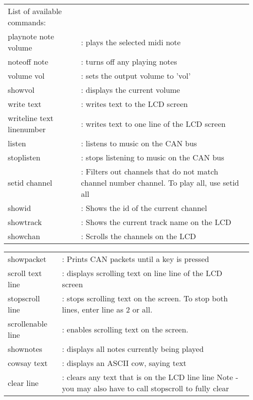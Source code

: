 \begin{table}[h]
\begin{tabular}{lp{8cm}}
List of available commands:\par\bigskip\noindent & \\
playnote note volume   & : plays the selected midi note\\
noteoff note           & : turns off any playing notes\\
volume vol           & : sets the output volume to 'vol'\\
showvol                & : displays the current volume\\
write text           & : writes text to the LCD screen\\
writeline text linenumber & : writes text to one line of the 
LCD screen\\ 
listen                 & : listens to music on the CAN bus\\
stoplisten             & : stops listening to music on the CAN bus\\
setid channel        & : Filters out channels that do not match 
channel number channel. To play all, use setid all\\
showid                 & : Shows the id of the current channel\\
showtrack              & : Shows the current track name on the LCD\\
showchan               & : Scrolls the channels on the LCD\\
\end{tabular}
\end{table}
\begin{table}[h]
\begin{tabular}{lp{10cm}}
showpacket             & : Prints CAN packets until a key is pressed\\
scroll text line & : displays scrolling text on line line of the 
LCD screen\\
stopscroll line      & : stops scrolling text on the screen. To stop both lines, 
enter line as 2 or all.\\
scrollenable line    & : enables scrolling text on the screen.\\
shownotes              & : displays all notes currently being played\\
cowsay text        & : displays an ASCII cow, saying text\\
clear line           & : clears any text that is on the LCD line line 
Note - you may also have to call stopscroll to fully clear\\
\end{tabular}
\end{table}

